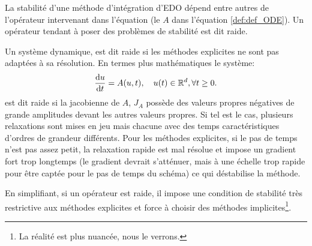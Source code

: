 La stabilité d'une méthode d'intégration d'EDO dépend entre autres de l'opérateur intervenant dans l'équation (le $A$ dans l'équation \ref{def:def_ODE}).
Un opérateur tendant à poser des problèmes de stabilité est dit raide.
\begin{definition}
    Un système dynamique, est dit raide si les méthodes explicites ne sont pas adaptées à sa résolution.
    En termes plus mathématiques le système:
    \begin{align}
    \frac{\text d u}{\text{d}t} = A(u,t), \quad u(t) \in \mathbb{R}^d, \forall t\geq 0.
    \end{align}
    est dit raide si la jacobienne de $A$, $J_A$ possède des valeurs propres négatives de grande amplitudes devant les autres valeurs propres.
    Si tel est le cas, plusieurs relaxations sont mises en jeu mais chacune avec des temps caractéristiques d'ordres de grandeur différents.
    Pour les méthodes explicites, si le pas de temps n'est pas assez petit, la relaxation rapide est mal résolue et
    impose un gradient fort trop longtemps (le gradient devrait s'atténuer, mais à une échelle trop rapide pour être captée pour le pas de temps du schéma) ce qui 
    déstabilise la méthode.
\end{definition}
En simplifiant, si un opérateur est raide, il impose une condition de stabilité très restrictive aux méthodes explicites et 
force à choisir des méthodes implicites\footnote{La réalité est plus nuancée, nous le verrons.}.

